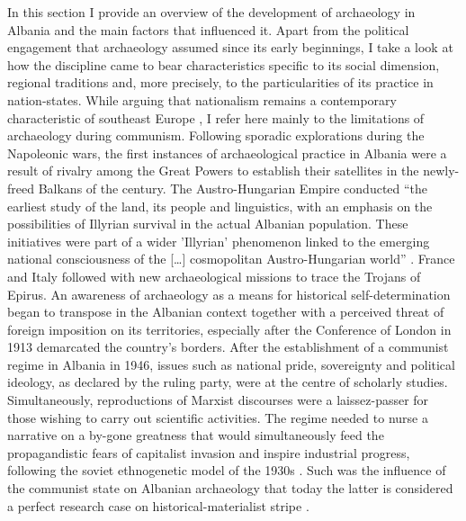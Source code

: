 In this section I provide an overview of the development of archaeology in Albania and the main factors that influenced it. Apart from the political engagement that archaeology assumed since its early beginnings, I take a look at how the discipline came to bear characteristics specific to its social dimension, regional traditions and, more precisely, to the particularities of its practice in nation-states. While arguing that nationalism remains a contemporary characteristic of southeast Europe \parencite{Korkuti1993}, I refer here mainly to the limitations of archaeology during communism.
	Following sporadic explorations during the Napoleonic wars, the first instances of archaeological practice in Albania were a result of rivalry among the Great Powers to establish their satellites in the newly-freed Balkans of the  century. The Austro-Hungarian Empire conducted ``the earliest study of the land, its people and linguistics, with an emphasis on the possibilities of Illyrian survival in the actual Albanian population. These initiatives were part of a wider 'Illyrian' phenomenon linked to the emerging national consciousness of the [\ldots] cosmopolitan Austro-Hungarian world'' \parencite[40]{Gilkes2006}. France and Italy followed with new archaeological missions to trace the Trojans of Epirus. An awareness of archaeology as a means for historical self-determination began to transpose in the Albanian context together with a perceived threat of foreign imposition on its territories, especially after the Conference of London in 1913 demarcated the country's borders.
After the establishment of a communist regime in Albania in 1946, issues such as national pride, sovereignty and political ideology, as declared by the ruling party, were at the centre of scholarly studies. Simultaneously, reproductions of Marxist discourses were a laissez-passer for those wishing to carry out scientific activities. The regime needed to nurse a narrative on a by-gone greatness that would simultaneously feed the propagandistic fears of capitalist invasion and inspire industrial progress, following the soviet ethnogenetic model of the 1930s \parencite[149]{Hodges2004}. Such was the influence of the communist state on Albanian archaeology that today the latter is considered a perfect research case on historical-materialist stripe \parencites[8]{Galaty2006}[703]{Korkuti1993}.
	
